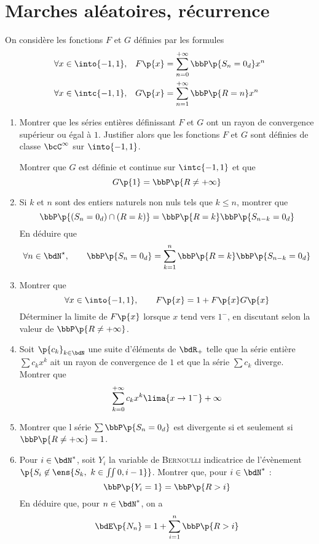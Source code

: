 \documentclass[a4paper,french,bookmarks]{article}
\begin{document}
    \section{Marches aléatoires, récurrence}
    
    On considère les fonctions $F$ et $G$ définies par les formules
    \begin{align*}
        \forall x \in \into{-1, 1},&& F\p{x} &= \sum_{n=0}^{+\infty} \bbP\p{S_n = 0_d} x^n\\
        \forall x \in \intc{-1, 1},&& G\p{x} &= \sum_{n=1}^{+\infty} \bbP\p{R = n}x^n
    \end{align*}
    
    \begin{enumerate}
        \item Montrer que les séries entières définissant $F$ et $G$ ont un rayon de convergence supérieur ou égal à $1$. Justifier alors que les fonctions $F$ et $G$ sont définies de classe $\bcC^\infty$ sur $\into{-1, 1}$.
    
        Montrer que $G$ est définie et continue sur $\intc{-1, 1}$ et que 
        \[ G\p{1} = \bbP\p{R \neq +\infty}\]
        
        \item Si $k$ et $n$ sont des entiers naturels non nuls tels que $k \leq n$, montrer que
        \[ \bbP\p{(S_n = 0_d) \cap (R = k)} = \bbP\p{R = k}\bbP\p{S_{n-k} = 0_d}\]
        En déduire que
        \[ \forall n \in \bdN^\star,\qquad \bbP\p{S_n = 0_d} = \sum_{k=1}^n \bbP\p{R = k}\bbP\p{S_{n-k} = 0_d}\]
        
        \item Montrer que
        \[ \forall x \in \into{-1, 1},\qquad F\p{x} = 1 + F\p{x}G\p{x}\]
        Déterminer la limite de $F\p{x}$ lorsque $x$ tend vers $1^-$, en discutant selon la valeur de $\bbP\p{R \neq +\infty}$.
        
        \item Soit $\p{c_k}_{k \in \bdN}$ une suite d'éléments de $\bdR_+$ telle que la série entière $\sum c_kx^k$ ait un rayon de convergence de $1$ et que la série $\sum c_k$ diverge. Montrer que
        \[ \sum_{k=0}^{+\infty} c_kx^k \lima{x \to 1^-} +\infty\]
        
        \item Montrer que l série $\sum \bbP\p{S_n = 0_d}$ est divergente si et seulement si $\bbP\p{R \neq +\infty} = 1$.
        
        \item Pour $i \in \bdN^*$, soit $Y_i$ la variable de \textsc{Bernoulli} indicatrice de l'évènement $\p{S_i \not\in \ens{S_k,\ k \in \iint{0, i-1}}}$. Montrer que, pour $i \in \bdN^*$ :
        \[ \bbP\p{Y_i = 1} = \bbP\p{R > i}\]
        En déduire que, pour $n \in \bdN^*$, on a
        \[ \bdE\p{N_n} = 1 + \sum_{i=1}^n \bbP\p{R > i}\]
    \end{enumerate}
    
\end{document}
